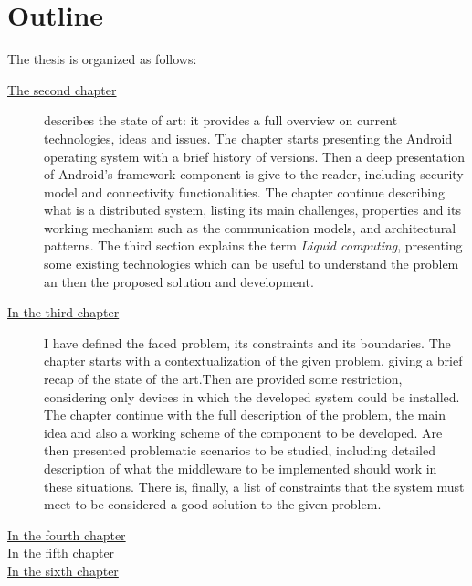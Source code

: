 \section{Outline}
%
\par The thesis is organized as follows:
%
%
\begin{description}
%
\item[{\hyperref[cap:statoarte]{The second chapter}}] describes the state of art: it provides a full overview on current technologies, ideas and issues. The chapter starts presenting the Android operating system with a brief history of versions. Then a deep presentation of Android's framework component is give to the reader, including security model and connectivity functionalities. The chapter continue describing what is a distributed system, listing its main challenges, properties and its working mechanism such as the communication models, and architectural patterns. The third section explains the term \textit{Liquid computing}, presenting some existing technologies which can be useful to understand the problem an then the proposed solution and development. %
%
\item[{\hyperref[cap:probanalysis]{In the third chapter}}] I have defined the faced problem, its constraints and its boundaries. The chapter starts with a contextualization of the given problem, giving a brief recap of the state of the art.Then are provided some restriction, considering only devices in which the developed system could be installed. The chapter continue with the full description of the problem, the main idea and also a working scheme of the component to be developed. Are then presented problematic scenarios to be studied, including detailed description of what the middleware to be implemented should work in these situations. There is, finally, a list of constraints that the system must meet to be considered a good solution to the given problem.

\item[{\hyperref[cap:proposedsolution]{In the fourth chapter}}] 

\item[{\hyperref[cap:proofofconcept]{In the fifth chapter}}]

\item[{\hyperref[cap:conclusions]{In the sixth chapter}}]
%
\end{description}
%
